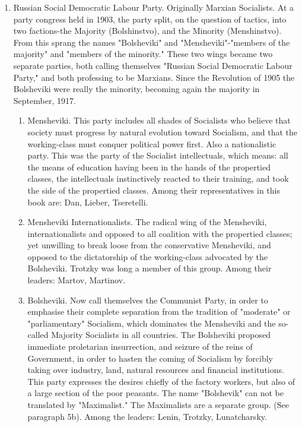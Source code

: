 \begin{enumerate}
\item Russian Social Democratic Labour Party. Originally Marxian Socialists. At a party congress held in 1903, the party split, on the question of tactics, into two factions-the Majority (Bolshinstvo), and the Minority (Menshinstvo). From this sprang the names "Bolsheviki" and "Mensheviki"-"members of the majority" and "members of the minority." These two wings became two separate parties, both calling themselves "Russian Social Democratic Labour Party," and both professing to be Marxians. Since the Revolution of 1905 the Bolsheviki were really the minority, becoming again the majority in September, 1917.
\begin{enumerate}
\item Mensheviki. This party includes all shades of Socialists who believe that society must progress by natural evolution toward Socialism, and that the working-class must conquer political power first. Also a nationalistic party. This was the party of the Socialist intellectuals, which means: all the means of education having been in the hands of the propertied classes, the intellectuals instinctively reacted to their training, and took the side of the propertied classes. Among their representatives in this book are: Dan, Lieber, Tseretelli.

\item Mensheviki Internationalists. The radical wing of the Mensheviki, internationalists and opposed to all coalition with the propertied classes; yet unwilling to break loose from the conservative Mensheviki, and opposed to the dictatorship of the working-class advocated by the Bolsheviki. Trotzky was long a member of this group. Among their leaders: Martov, Martinov.

\item Bolsheviki. Now call themselves the Communist Party, in order to emphasise their complete separation from the tradition of "moderate" or "parliamentary" Socialism, which dominates the Mensheviki and the so-called Majority Socialists in all countries. The Bolsheviki proposed immediate proletarian insurrection, and seizure of the reins of Government, in order to hasten the coming of Socialism by forcibly taking over industry, land, natural resources and financial institutions. This party expresses the desires chiefly of the factory workers, but also of a large section of the poor peasants. The name "Bolshevik" can not be translated by "Maximalist." The Maximalists are a separate group. (See paragraph 5b). Among the leaders: Lenin, Trotzky, Lunatcharsky.


\end{enumerate}
\end{enumerate}
